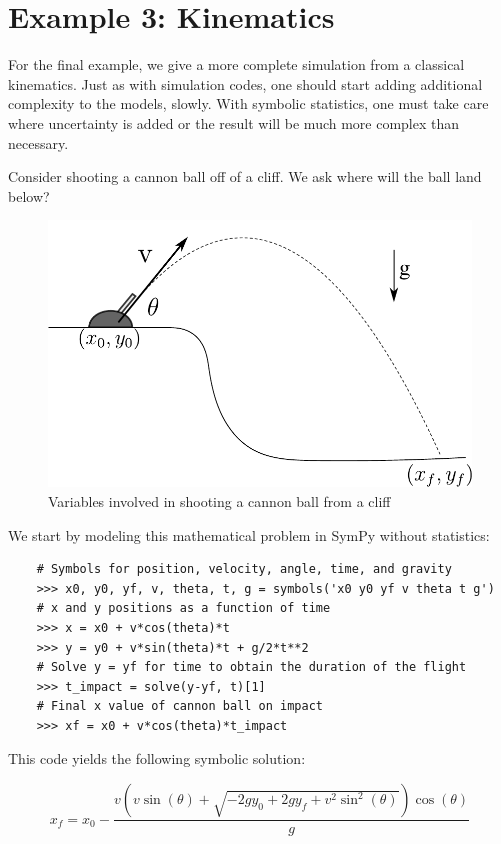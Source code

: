 \section{Example 3: Kinematics}

For the final example, we give a more complete simulation from a classical
kinematics.  Just as with simulation codes, one should start adding additional
complexity to the models, slowly.  With symbolic statistics, one must take care
where uncertainty is added or the result will be much more complex than
necessary.

Consider shooting a cannon ball off of a cliff. We ask where will the ball land below?

\begin{figure}[ht]
\vspace{-0pt}
\centering
\includegraphics[width=.55\textwidth]{images/kinematics}
\vspace{-0pt}
\caption{Variables involved in shooting a cannon ball from a cliff}
\label{fig:kinematics}
\vspace{00pt}
\end{figure}
We start by modeling this mathematical problem in SymPy without statistics:

\begin{lstlisting}
    # Symbols for position, velocity, angle, time, and gravity
    >>> x0, y0, yf, v, theta, t, g = symbols('x0 y0 yf v theta t g')
    # x and y positions as a function of time
    >>> x = x0 + v*cos(theta)*t
    >>> y = y0 + v*sin(theta)*t + g/2*t**2
    # Solve y = yf for time to obtain the duration of the flight
    >>> t_impact = solve(y-yf, t)[1]
    # Final x value of cannon ball on impact
    >>> xf = x0 + v*cos(theta)*t_impact
\end{lstlisting}
This code yields the following symbolic solution:

\begin{equation}
\label{eqn:kinematics_symbolic}
x_f = x_{0} - \frac{v \left(v \sin{\left (\theta \right )} + \sqrt{- 2 g y_{0} + 2 g y_f + v^{2} \sin^{2}{\left (\theta \right )}}\right) \cos{\left (\theta \right )}}{g}
\end{equation}

